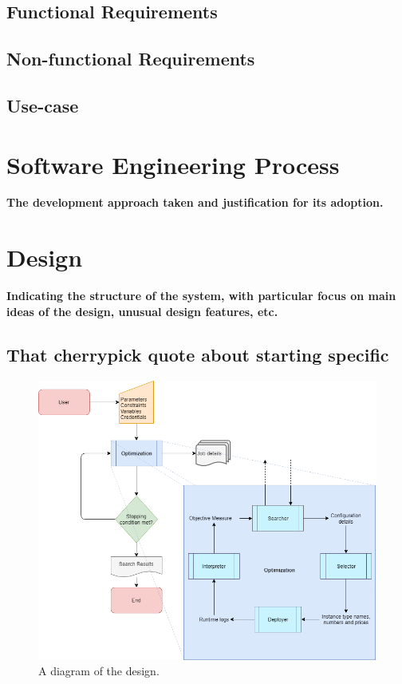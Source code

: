 \documentclass{article}
\begin{document}
\subsection{Functional Requirements}
\subsection{Non-functional Requirements}
\subsection{Use-case}
\section{Software Engineering Process}
\textbf{The development approach taken and justification for its
adoption.}
\section{Design}
\textbf{Indicating the structure of the system, with particular
focus on main ideas of the design, unusual design
features, etc. \\}
\subsection{That cherrypick quote about starting specific}
\begin{figure}[!ht]
  \caption{A diagram of the design.}
  \centering
   \includegraphics[scale=0.8]{Design_flowchart}
\end{figure}
\end{document}
